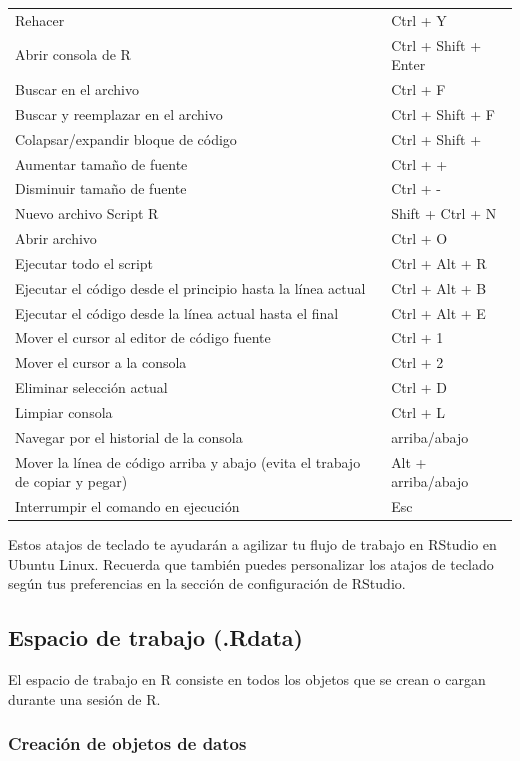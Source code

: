 \documentclass[
  a4paper,
]{article}
\begin{document}
\begin{longtable}[]{@{}
  >{\raggedright\arraybackslash}p{}
  >{\raggedright\arraybackslash}p{}@{}}
Rehacer & Ctrl + Y \\
Abrir consola de R & Ctrl + Shift + Enter \\
Buscar en el archivo & Ctrl + F \\
Buscar y reemplazar en el archivo & Ctrl + Shift + F \\
Colapsar/expandir bloque de código & Ctrl + Shift + \\
Aumentar tamaño de fuente & Ctrl + + \\
Disminuir tamaño de fuente & Ctrl + - \\
Nuevo archivo Script R & Shift + Ctrl + N \\
Abrir archivo & Ctrl + O \\
Ejecutar todo el script & Ctrl + Alt + R \\
Ejecutar el código desde el principio hasta la línea actual & Ctrl + Alt
+ B \\
Ejecutar el código desde la línea actual hasta el final & Ctrl + Alt +
E \\
Mover el cursor al editor de código fuente & Ctrl + 1 \\
Mover el cursor a la consola & Ctrl + 2 \\
Eliminar selección actual & Ctrl + D \\
Limpiar consola & Ctrl + L \\
Navegar por el historial de la consola & arriba/abajo \\
Mover la línea de código arriba y abajo (evita el trabajo de copiar y
pegar) & Alt + arriba/abajo \\
Interrumpir el comando en ejecución & Esc \\
\end{longtable}

Estos atajos de teclado te ayudarán a agilizar tu flujo de trabajo en
RStudio en Ubuntu Linux. Recuerda que también puedes personalizar los
atajos de teclado según tus preferencias en la sección de configuración
de RStudio.

\hypertarget{espacio-de-trabajo-.rdata}{%
\subsection{Espacio de trabajo
(.Rdata)}\label{espacio-de-trabajo-.rdata}}

El espacio de trabajo en R consiste en todos los objetos que se crean o
cargan durante una sesión de R.

\hypertarget{creaciuxf3n-de-objetos-de-datos}{%
\subsubsection{Creación de objetos de
datos}\label{creaciuxf3n-de-objetos-de-datos}}
\end{document}
